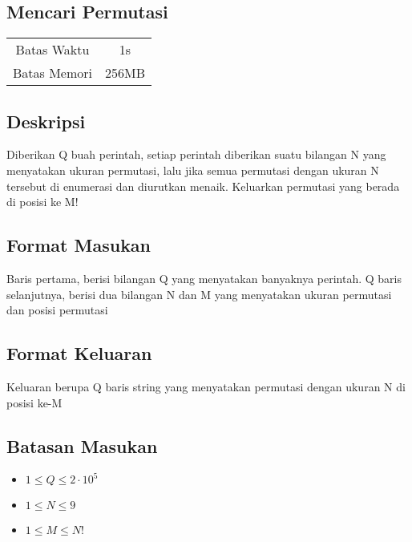 \documentclass{article}
\begin{document}
\begin{center}
    \section*{Mencari Permutasi} %

    \begin{tabular}{ | c c | }
        \hline
        Batas Waktu  & 1s \\    %
        Batas Memori & 256MB \\  %
        \hline
    \end{tabular}
\end{center}

\subsection*{Deskripsi}
Diberikan Q buah perintah, setiap perintah diberikan suatu bilangan N yang menyatakan ukuran permutasi, lalu jika semua permutasi dengan ukuran N tersebut di enumerasi dan diurutkan menaik. Keluarkan permutasi yang berada di posisi ke M!


\subsection*{Format Masukan}
Baris pertama, berisi bilangan Q yang menyatakan banyaknya perintah. Q baris selanjutnya, berisi dua bilangan N dan M yang menyatakan ukuran permutasi dan posisi permutasi

\subsection*{Format Keluaran}
Keluaran berupa Q baris string yang menyatakan permutasi dengan ukuran N di posisi ke-M

\subsection*{Batasan Masukan}
\begin{itemize}
 \item $1 \leq Q  \leq 2 \cdot 10^5$
 \item $1 \leq N  \leq 9$
 \item $1 \leq M  \leq N!$
\end{itemize}
\end{document}
